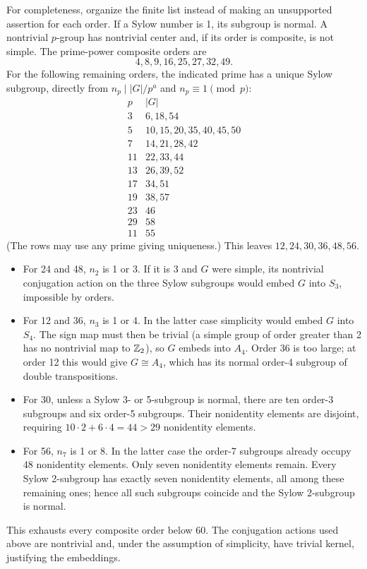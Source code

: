 \idea For completeness, organize the finite list instead of making an unsupported assertion for each order. If a Sylow number is 1, its subgroup is normal. A nontrivial $p$-group has nontrivial center and, if its order is composite, is not simple.
The prime-power composite orders are
\[
4,8,9,16,25,27,32,49.
\]
For the following remaining orders, the indicated prime has a unique Sylow subgroup, directly from $n_p\mid |G|/p^a$ and $n_p\equiv1\pmod p$:
\[
\begin{array}{c|l}
p& |G|\\\hline
3&6,18,54\\
5&10,15,20,35,40,45,50\\
7&14,21,28,42\\
11&22,33,44\\
13&26,39,52\\
17&34,51\\
19&38,57\\
23&46\\
29&58\\
11&55
\end{array}
\]
(The rows may use any prime giving uniqueness.) This leaves $12,24,30,36,48,56$.
\begin{itemize}
\item For 24 and 48, $n_2$ is 1 or 3. If it is 3 and $G$ were simple, its nontrivial conjugation action on the three Sylow subgroups would embed $G$ into $S_3$, impossible by orders.
\item For 12 and 36, $n_3$ is 1 or 4. In the latter case simplicity would embed $G$ into $S_4$. The sign map must then be trivial (a simple group of order greater than 2 has no nontrivial map to $\mathbb{Z}_2$), so $G$ embeds into $A_4$. Order 36 is too large; at order 12 this would give $G\cong A_4$, which has its normal order-4 subgroup of double transpositions.
\item For 30, unless a Sylow 3- or 5-subgroup is normal, there are ten order-3 subgroups and six order-5 subgroups. Their nonidentity elements are disjoint, requiring $10\cdot2+6\cdot4=44>29$ nonidentity elements.
\item For 56, $n_7$ is 1 or 8. In the latter case the order-7 subgroups already occupy 48 nonidentity elements. Only seven nonidentity elements remain. Every Sylow 2-subgroup has exactly seven nonidentity elements, all among these remaining ones; hence all such subgroups coincide and the Sylow 2-subgroup is normal.
\end{itemize}
This exhausts every composite order below 60. The conjugation actions used above are nontrivial and, under the assumption of simplicity, have trivial kernel, justifying the embeddings.

